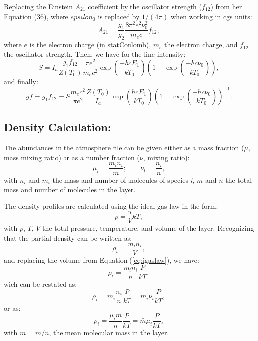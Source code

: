 \documentclass[letterpaper,12pt]{article}
\begin{document}
Replacing the Einstein $A_{21}$ coefficient by the
oscillator strength ($f_{12}$) from her Equation (36), where
$epsilon_0$ is replaced by $1/(4\pi)$ when working in cgs units:
\begin{equation}
A_{21} = \frac{g_1}{g_2}\frac{8 \pi^2 e^2 \nu_0^2}{m_e c} f_{12},
\end{equation}
where $e$ is the electron charge (in statCoulomb), $m_e$ the
electron charge, and $f_{12}$ the oscillator strength.
Then, we have for the line intensity:
\begin{equation}
S = I_a \frac{g_1 f_{12}}{Z(T_0)} \frac{\pi e^2} {m_e c^2}
        \exp\left(\frac{-hcE_1}{kT_0}\right)
        \left(1-\exp\left(\frac{-hc\nu_0}{kT_0}\right)\right),
\end{equation}
and finally:
\begin{equation}
gf = g_1 f_{12} = S \frac{m_e c^2} {\pi e^2} \frac{Z(T_0)}{I_a} 
        \exp\left(\frac{hcE_1}{kT_0}\right)
        \left(1-\exp\left(\frac{-hc\nu_0}{kT_0}\right)\right)^{-1}.
\end{equation}

\subsection{Density Calculation:}

The abundances in the atmosphere file can be given either as a mass
fraction ($\mu$, mass mixing ratio) or as a number fraction ($\nu$,
mixing ratio):
\begin{equation}
\mu_i = \frac{m_in_i}{m}; \qquad \nu_i = \frac{n_i}{n},
\end{equation}
with $n_i$ and $m_i$ the mass and number of molecules of species $i$,
$m$ and $n$ the total mass and number of molecules in the layer.

The density profiles are calculated using the ideal gas law in the form:
\begin{equation}
p = \frac{n}{V}kT,
\label{eq:igaslaw}
\end{equation}
with $p$, $T$, $V$ the total pressure, temperature, and volume of the
layer.  Recognizing that the partial density can be written as:
\begin{equation}
\rho_i = \frac{m_in_i}{V},
\end{equation}
and replacing the volume from Equation (\ref{eq:igaslaw}), we have:
\begin{equation}
  \rho_i = \frac{m_in_i}{n}\frac{P}{kT},
\end{equation}
wich can be restated as:
\begin{equation}
  \rho_i = m_i\frac{n_i}{n}\frac{P}{kT} = m_i\nu_i\frac{P}{kT},
\end{equation}
or as:
\begin{equation}
  \rho_i = \frac{\mu_im}{n}\frac{P}{kT} = \bar{m}\mu_i\frac{P}{kT},
\end{equation}
with $\bar{m} = m/n$, the mean molecular mass in the layer.
\end{document}

